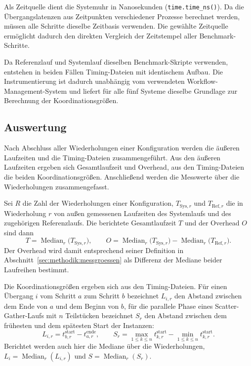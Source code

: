 Als Zeitquelle dient die Systemuhr in Nanosekunden
(\texttt{time.time\_ns()}). Da die Übergangslatenzen aus
Zeitpunkten verschiedener Prozesse berechnet werden, müssen alle
Schritte dieselbe Zeitbasis verwenden. Die gewählte Zeitquelle
ermöglicht dadurch den direkten Vergleich der Zeitstempel aller
Benchmark-Schritte.

Da Referenzlauf und Systemlauf dieselben Benchmark-Skripte
verwenden, entstehen in beiden Fällen Timing-Dateien mit
identischem Aufbau. Die Instrumentierung ist dadurch unabhängig
vom verwendeten Workflow-Management-System und liefert für alle
fünf Systeme dieselbe Grundlage zur Berechnung der
Koordinationsgrößen.

\subsection{Auswertung}
\label{sec:methodik:auswertung}

Nach Abschluss aller Wiederholungen einer Konfiguration werden die
äußeren Laufzeiten und die Timing-Dateien zusammengeführt. Aus den
äußeren Laufzeiten ergeben sich Gesamtlaufzeit und Overhead, aus
den Timing-Dateien die beiden Koordinationsgrößen. Anschließend
werden die Messwerte über die Wiederholungen zusammengefasst.

Sei $R$ die Zahl der Wiederholungen einer Konfiguration,
$T_{\mathrm{Sys},r}$ und $T_{\mathrm{Ref},r}$ die in Wiederholung
$r$ von außen gemessenen Laufzeiten des Systemlaufs und des
zugehörigen Referenzlaufs. Die berichtete Gesamtlaufzeit $T$ und
der Overhead $O$ sind dann
\[
  T = \operatorname{Median}_{r}\bigl(T_{\mathrm{Sys},r}\bigr),
  \qquad
  O = \operatorname{Median}_{r}\bigl(T_{\mathrm{Sys},r}\bigr)
      - \operatorname{Median}_{r}\bigl(T_{\mathrm{Ref},r}\bigr).
\]
Der Overhead wird damit entsprechend seiner Definition in
Abschnitt~\ref{sec:methodik:messgroessen} als Differenz der
Mediane beider Laufreihen bestimmt.

Die Koordinationsgrößen ergeben sich aus den Timing-Dateien. Für
einen Übergang $i$ vom Schritt $a$ zum Schritt $b$ bezeichnet
$L_{i,r}$ den Abstand zwischen dem Ende von $a$ und dem Beginn von
$b$, für die parallele Phase eines Scatter-Gather-Laufs mit $n$
Teilstücken bezeichnet $S_r$ den Abstand zwischen dem frühesten und
dem spätesten Start der Instanzen:
\[
  L_{i,r} = t^{\text{start}}_{b,r} - t^{\text{ende}}_{a,r},
  \qquad
  S_r = \max_{1 \le k \le n} t^{\text{start}}_{k,r}
      - \min_{1 \le k \le n} t^{\text{start}}_{k,r}.
\]
Berichtet werden auch hier die Mediane über die Wiederholungen,
$L_i = \operatorname{Median}_{r}(L_{i,r})$ und
$S = \operatorname{Median}_{r}(S_r)$.

